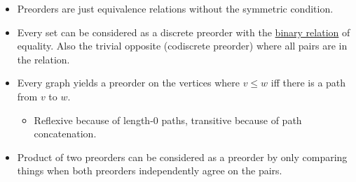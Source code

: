 \begin{itemize}
    \item Preorders are just equivalence relations without the symmetric condition.
    \item Every set can be considered as a discrete preorder with the \href{doc/1 math/Seven Sketches in Compositionality/1 Chapter 1: Generative Effects/2 What is order/Function}{binary relation} of equality. Also the trivial opposite (codiscrete preorder) where all pairs are in the relation.
    \item Every graph yields a preorder on the vertices where $v \leq w$ iff there is a path from $v$ to $w$.
          \begin{itemize}
            \item Reflexive because of length-0 paths, transitive because of path concatenation.
          \end{itemize}
    \item Product of two preorders can be considered as a preorder by only comparing things when both preorders independently agree on the pairs.
  \end{itemize}